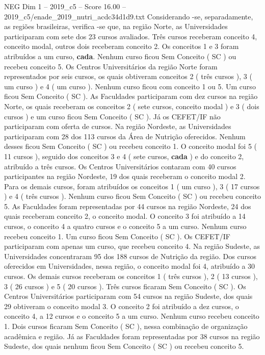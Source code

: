 \begin{textsample}{NEG Dim 1 – 2019\_c5 – Score 16.00 – 2019\_c5/enade\_2019\_nutri\_acdc34d1d9.txt}
Considerando -se, separadamente, as regiões brasileiras, verifica -se que, na região Norte, as Universidades participaram com sete dos 23 cursos avaliados.
Três cursos receberam conceito 4, conceito modal, outros dois receberam conceito 2.
Os conceitos 1 e 3 foram atribuídos a um curso, \textbf{cada}.
Nenhum curso ficou Sem Conceito ( SC ) ou recebeu conceito 5.
Os Centros Universitários da região Norte foram representados por seis cursos, os quais obtiveram conceitos 2 ( três cursos ), 3 ( um curso ) e 4 ( um curso ).
Nenhum curso ficou com conceito 1 ou 5.
Um curso ficou Sem Conceito ( SC ).
As Faculdades participaram com dez cursos na região Norte, os quais receberam os conceitos 2 ( sete cursos, conceito modal ) e 3 ( dois cursos ) e um curso ficou Sem Conceito ( SC ).
Já os CEFET/IF não participaram com oferta de cursos.
Na região Nordeste, as Universidades participaram com 28 dos 113 cursos da Área de Nutrição oferecidos.
Nenhum desses ficou Sem Conceito ( SC ) ou recebeu conceito 1.
O conceito modal foi 5 ( 11 cursos ), seguido dos conceitos 3 e 4 ( sete cursos, \textbf{cada} ) e do conceito 2, atribuído a três cursos.
Os Centros Universitários contaram com 40 cursos participantes na região Nordeste, 19 dos quais receberam o conceito modal 2.
Para os demais cursos, foram atribuídos os conceitos 1 ( um curso ), 3 ( 17 cursos ) e 4 ( três cursos ).
Nenhum curso ficou Sem Conceito ( SC ) ou recebeu conceito 5.
As Faculdades foram representadas por 44 cursos na região Nordeste, 24 dos quais receberam conceito 2, o conceito modal.
O conceito 3 foi atribuído a 14 cursos, o conceito 4 a quatro cursos e o conceito 5 a um curso.
Nenhum curso recebeu conceito 1.
Um curso ficou Sem Conceito ( SC ).
Os CEFET/IF participaram com apenas um curso, que recebeu conceito 4.
Na região Sudeste, as Universidades concentraram 95 dos 188 cursos de Nutrição da região.
Dos cursos oferecidos em Universidades, nessa região, o conceito modal foi 4, atribuído a 30 cursos.
Os demais cursos receberam os conceitos 1 ( três cursos ), 2 ( 13 cursos ), 3 ( 26 cursos ) e 5 ( 20 cursos ).
Três cursos ficaram Sem Conceito ( SC ).
Os Centros Universitários participaram com 54 cursos na região Sudeste, dos quais 29 obtiveram o conceito modal 3.
O conceito 2 foi atribuído a dez cursos, o conceito 4, a 12 cursos e o conceito 5 a um curso.
Nenhum curso recebeu conceito 1.
Dois cursos ficaram Sem Conceito ( SC ), nessa combinação de organização acadêmica e região.
Já as Faculdades foram representadas por 38 cursos na região Sudeste, dos quais nenhum ficou Sem Conceito ( SC ) ou recebeu conceito 5.

\end{textsample}
